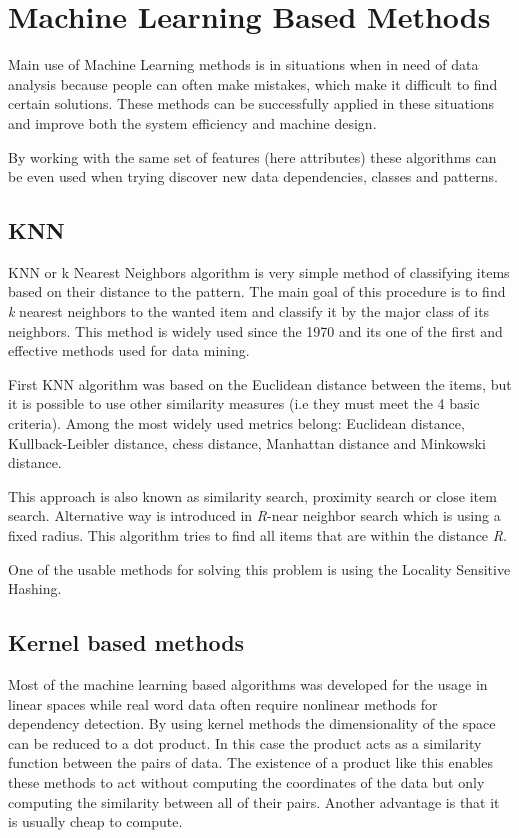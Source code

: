 \section{Machine Learning Based Methods}
Main use of Machine Learning methods is in situations when in need of data analysis because people can often make mistakes, which make it difficult to find certain solutions.
These methods can be successfully applied in these situations and improve both the system efficiency and machine design. 

By working with the same set of features (here attributes) these algorithms can be even used when trying discover new data dependencies, classes and patterns. \cite{mlbm}
\subsection{KNN}
KNN or k Nearest Neighbors algorithm is very simple method of classifying items based on their distance to the pattern. The main goal of this procedure is to find \textit{k} nearest neighbors to the wanted item and classify it by the major class of its neighbors. This method is widely used since the 1970 and its one of the first and effective methods used for data mining.

First KNN algorithm was based on the Euclidean distance between the items, but it is possible to use other similarity measures (i.e they must meet the 4 basic criteria). Among the most widely used metrics belong: Euclidean distance, Kullback-Leibler distance, chess distance, Manhattan distance and Minkowski distance.

This approach is also known as similarity search, proximity search or close item search. Alternative way is introduced in \textit{R}-near neighbor search which is using a fixed radius. This algorithm tries to find all items that are within the distance \textit{R}. \cite{hashing}

One of the usable methods for solving this problem is using the Locality Sensitive Hashing.

\subsection{Kernel based methods}
Most of the machine learning based algorithms was developed for the usage in linear spaces while real word data often require nonlinear methods for dependency detection. By using kernel methods the dimensionality of the space can be reduced to a dot product. In this case the product acts as a similarity function between the pairs of data. The existence of a product like this enables these methods to act without computing the coordinates of the data but only computing the similarity between all of their pairs. Another advantage is that it is usually cheap to compute.


